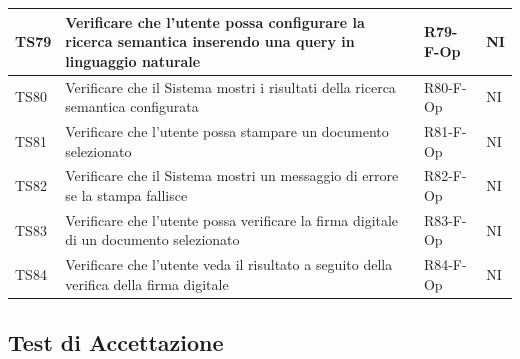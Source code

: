 \documentclass[a4paper,12pt]{article}
\begin{document}
\begin{longtable}{|M{1.2cm}|M{6.3cm}|M{2.5cm}|M{1.5cm}|}
                TS79 & Verificare che l'utente possa configurare la ricerca semantica inserendo una query in linguaggio naturale & R79-F-Op & NI \\
                \hline

                TS80 & Verificare che il Sistema mostri i risultati della ricerca semantica configurata & R80-F-Op & NI \\
                \hline

                TS81 & Verificare che l'utente possa stampare un documento selezionato & R81-F-Op & NI \\
                \hline

                TS82 & Verificare che il Sistema mostri un messaggio di errore se la stampa fallisce & R82-F-Op & NI \\
                \hline

                TS83 & Verificare che l'utente possa verificare la firma digitale di un documento selezionato & R83-F-Op & NI \\
                \hline

                TS84 & Verificare che l'utente veda il risultato a seguito della verifica della firma digitale & R84-F-Op & NI \\
                \hline

            \end{longtable}

        \subsection{Test di Accettazione}
        
\end{document}
